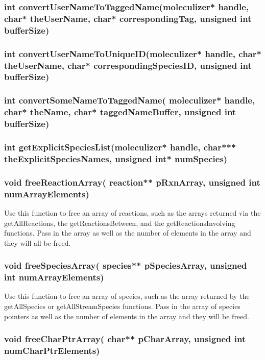 \subsubsection{int convertUserNameToTaggedName(moleculizer* handle, char* theUserName, char* correspondingTag, unsigned int bufferSize)}

\subsubsection{int convertUserNameToUniqueID(moleculizer* handle, char* theUserName, char* correspondingSpeciesID, unsigned int bufferSize)}

\subsubsection{int convertSomeNameToTaggedName( moleculizer* handle, char* theName, char* taggedNameBuffer, unsigned int bufferSize)}

\subsubsection{int getExplicitSpeciesList(moleculizer* handle, char*** theExplicitSpeciesNames, unsigned int* numSpecies)}

\subsubsection{void freeReactionArray( reaction** pRxnArray, unsigned
  int numArrayElements)}

Use this function to free an array of reactions, such as the arrays
returned via the getAllReactions, the getReactionsBetween, and the
getReactionsInvolving functions.  Pass in the array as well as the
number of elements in the array and they will all be freed.

\subsubsection{void freeSpeciesArray( species** pSpeciesArray,
  unsigned int numArrayElements)}

Use this function to free an array of species, such as the array
returned by the getAllSpecies or getAllStreamSpecies functions.  Pass
in the array of species pointers as well as the number of elements in
the array and they will be freed.

\subsubsection{void freeCharPtrArray( char** pCharArray, unsigned int numCharPtrElements)}

